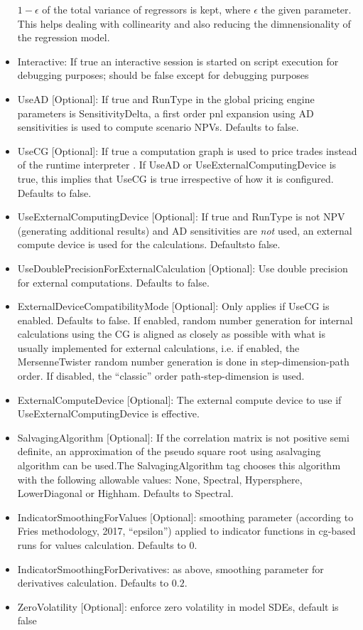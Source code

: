 \begin{itemize}
  $1-\epsilon$ of the total variance of regressors is kept, where $\epsilon$ the given parameter. This helps dealing
  with collinearity and also reducing the dimnensionality of the regression model.
\item Interactive: If true an interactive session is started on script execution for debugging purposes; should be false
  except for debugging purposes
\item UseAD [Optional]: If true and RunType in the global pricing engine parameters is SensitivityDelta, a first order
  pnl expansion using AD sensitivities is used to compute scenario NPVs. Defaults to false.
\item UseCG [Optional]: If true a computation graph is used to price trades instead of the runtime interpreter . If
  UseAD or UseExternalComputingDevice is true, this implies that UseCG is true irrespective of how it is
  configured. Defaults to false.
\item UseExternalComputingDevice [Optional]: If true and RunType is not NPV (generating additional results) and AD
  sensitivities are {\em not} used, an external compute device is used for the calculations. Defaultsto false.
\item UseDoublePrecisionForExternalCalculation [Optional]: Use double precision for external computations. Defaults to
  false.
\item ExternalDeviceCompatibilityMode [Optional]: Only applies if UseCG is enabled. Defaults to false. If enabled,
  random number generation for internal calculations using the CG is aligned as closely as possible with what is usually
  implemented for external calculations, i.e. if enabled, the MersenneTwister random number generation is done in
  step-dimension-path order. If disabled, the ``classic'' order path-step-dimension is used.
\item ExternalComputeDevice [Optional]: The external compute device to use if UseExternalComputingDevice is effective.
\item SalvagingAlgorithm [Optional]: If the correlation matrix is not positive semi definite, an approximation of the
  pseudo square root using asalvaging algorithm can be used.The SalvagingAlgorithm tag chooses this algorithm with the
  following allowable values: None, Spectral, Hypersphere, LowerDiagonal or Highham. Defaults to Spectral.
\item IndicatorSmoothingForValues [Optional]: smoothing parameter (according to Fries methodology, 2017, ``epsilon'')
  applied to indicator functions in cg-based runs for values calculation. Defaults to $0$.
\item IndicatorSmoothingForDerivatives: as above, smoothing parameter for derivatives calculation. Defaults to $0.2$.
\item ZeroVolatility [Optional]: enforce zero volatility in model SDEs, default is false
\end{itemize}

